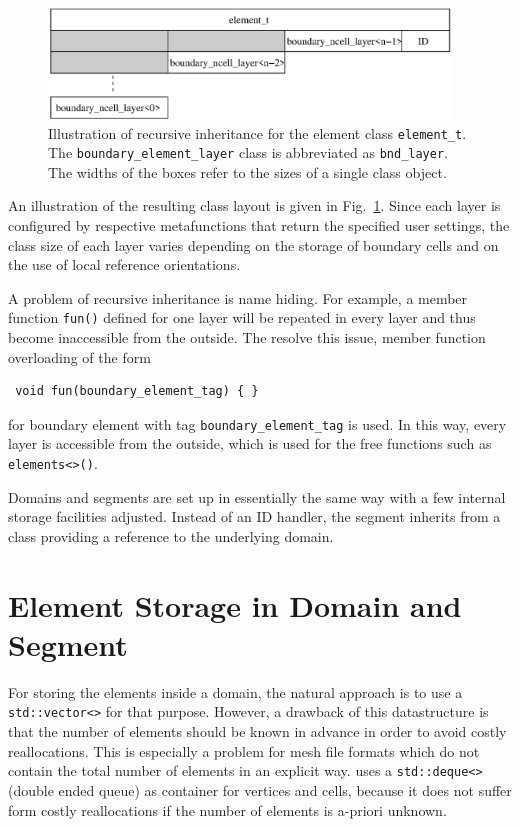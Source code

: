 \begin{figure}[tb]
\centering
 \includegraphics[width=0.95\textwidth]{figures/recursive-inheritance.eps}
 \caption{Illustration of recursive inheritance for the element class \lstinline|element_t|. The \lstinline|boundary_element_layer| class is abbreviated as \lstinline|bnd_layer|. The widths of the boxes refer to the sizes of a single class object.}
 \label{fig:recursive-inheritance}
\end{figure}
An illustration of the resulting class layout is given in Fig.~\ref{fig:recursive-inheritance}.
Since each layer is configured by respective metafunctions that return the specified user settings,
the class size of each layer varies depending on the storage of boundary cells and on the use of local reference orientations.

A problem of recursive inheritance is name hiding. For example, a member function \lstinline|fun()| defined for one layer
will be repeated in every layer and thus become inaccessible from the outside. The resolve this issue, member function overloading of the form
\begin{lstlisting}
 void fun(boundary_element_tag) { }
\end{lstlisting}
for boundary element with tag \lstinline|boundary_element_tag| is used. In this way, every layer is accessible from the outside, which is used for the free functions such as \lstinline|elements<>()|.

Domains and segments are set up in essentially the same way with a few internal storage facilities adjusted.
Instead of an ID handler, the segment inherits from a class providing a reference to the underlying domain.

\section{Element Storage in Domain and Segment}
For storing the elements inside a domain, the natural approach is to use a \lstinline|std::vector<>| for that purpose.
However, a drawback of this datastructure is that the number of elements should be known in advance in order to avoid
costly reallocations. This is especially a problem for mesh file formats which do not contain the total number of elements in an explicit way.
{\ViennaGrid} uses a \lstinline|std::deque<>| (double ended queue) as container for vertices and cells, because it does not suffer form costly reallocations
if the number of elements is a-priori unknown.

